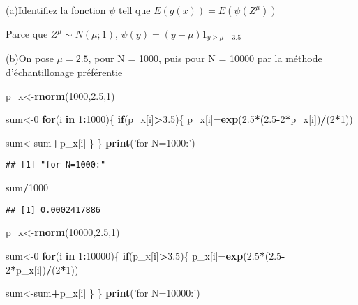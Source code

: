 \documentclass[]{article}
\newenvironment{Shaded}{\begin{snugshade}}{\end{snugshade}}
\newcommand{\KeywordTok}[1]{\textcolor[rgb]{0.13,0.29,0.53}{\textbf{#1}}}
\newcommand{\DecValTok}[1]{\textcolor[rgb]{0.00,0.00,0.81}{#1}}
\newcommand{\FloatTok}[1]{\textcolor[rgb]{0.00,0.00,0.81}{#1}}
\newcommand{\StringTok}[1]{\textcolor[rgb]{0.31,0.60,0.02}{#1}}
\newcommand{\ControlFlowTok}[1]{\textcolor[rgb]{0.13,0.29,0.53}{\textbf{#1}}}
\newcommand{\OperatorTok}[1]{\textcolor[rgb]{0.81,0.36,0.00}{\textbf{#1}}}
\newcommand{\NormalTok}[1]{#1}
\begin{document}
(a)Identifiez la fonction \(\psi\) tell que \(E(g(x))=E(\psi(Z^{\mu}))\)

Parce que \(Z^{\mu}\sim N(\mu;1)\), \(\psi(y)=(y-\mu)1_{y\ge\mu+3.5}\)

(b)On pose \(\mu=2.5\), pour N = 1000, puis pour N = 10000 par la
méthode d'échantillonage préférentie

\begin{Shaded}
\begin{Highlighting}[]
\NormalTok{p_x<-}\KeywordTok{rnorm}\NormalTok{(}\DecValTok{1000}\NormalTok{,}\FloatTok{2.5}\NormalTok{,}\DecValTok{1}\NormalTok{)}

\NormalTok{sum<-}\DecValTok{0}
\ControlFlowTok{for}\NormalTok{(i }\ControlFlowTok{in} \DecValTok{1}\OperatorTok{:}\DecValTok{1000}\NormalTok{)\{}
  \ControlFlowTok{if}\NormalTok{(p_x[i]}\OperatorTok{>}\FloatTok{3.5}\NormalTok{)\{}
\NormalTok{  p_x[i]=}\KeywordTok{exp}\NormalTok{(}\FloatTok{2.5}\OperatorTok{*}\NormalTok{(}\FloatTok{2.5}\OperatorTok{-}\DecValTok{2}\OperatorTok{*}\NormalTok{p_x[i])}\OperatorTok{/}\NormalTok{(}\DecValTok{2}\OperatorTok{*}\DecValTok{1}\NormalTok{))}
  
\NormalTok{    sum<-sum}\OperatorTok{+}\NormalTok{p_x[i]}
\NormalTok{  \}}
\NormalTok{\}}
\KeywordTok{print}\NormalTok{(}\StringTok{'for N=1000:'}\NormalTok{)}
\end{Highlighting}
\end{Shaded}

\begin{verbatim}
## [1] "for N=1000:"
\end{verbatim}

\begin{Shaded}
\begin{Highlighting}[]
\NormalTok{sum}\OperatorTok{/}\DecValTok{1000}
\end{Highlighting}
\end{Shaded}

\begin{verbatim}
## [1] 0.0002417886
\end{verbatim}

\begin{Shaded}
\begin{Highlighting}[]
\NormalTok{p_x<-}\KeywordTok{rnorm}\NormalTok{(}\DecValTok{10000}\NormalTok{,}\FloatTok{2.5}\NormalTok{,}\DecValTok{1}\NormalTok{)}


\NormalTok{sum<-}\DecValTok{0}
\ControlFlowTok{for}\NormalTok{(i }\ControlFlowTok{in} \DecValTok{1}\OperatorTok{:}\DecValTok{10000}\NormalTok{)\{}
  \ControlFlowTok{if}\NormalTok{(p_x[i]}\OperatorTok{>}\FloatTok{3.5}\NormalTok{)\{}
\NormalTok{  p_x[i]=}\KeywordTok{exp}\NormalTok{(}\FloatTok{2.5}\OperatorTok{*}\NormalTok{(}\FloatTok{2.5}\OperatorTok{-}\DecValTok{2}\OperatorTok{*}\NormalTok{p_x[i])}\OperatorTok{/}\NormalTok{(}\DecValTok{2}\OperatorTok{*}\DecValTok{1}\NormalTok{))}

\NormalTok{    sum<-sum}\OperatorTok{+}\NormalTok{p_x[i]}
\NormalTok{  \}}
\NormalTok{\}}
\KeywordTok{print}\NormalTok{(}\StringTok{'for N=10000:'}\NormalTok{)}
\end{Highlighting}
\end{Shaded}
\end{document}
